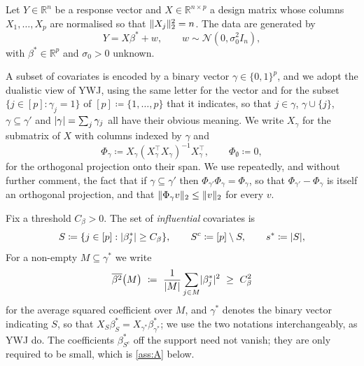 \documentclass[aos]{imsart}
\DeclarePairedDelimiter{\norm}{\lVert}{\rVert}
\DeclarePairedDelimiter{\abs}{\lvert}{\rvert}
\newcommand{\bbR}[0]{\mathbb{R}}
\newcommand{\calN}[0]{\mathcal{N}}
\newcommand{\signal}{X_{\gamma^{\ast}}\beta^{\ast}_{\gamma^{\ast}}}
\newcommand{\betabar}[1]{\overline{\beta^{2}}\bigl(#1\bigr)}
\theoremstyle{plain}
\theoremstyle{definition}
\begin{document}
    Let $Y\in\bbR^{n}$ be a response vector and $X\in\bbR^{n\times p}$ a
    design matrix whose columns $X_1,\dots,X_p$ are normalised so that
    $\norm{X_j}_2^{2}=n$. The data are generated by
    \begin{equation}
        \label{eq:linear}
        Y=X\beta^{\ast}+w,\qquad w\sim\calN(0,\sigma_0^{2}I_n),
    \end{equation}
    with $\beta^\ast\in\bbR^{p}$ and $\sigma_0>0$ unknown.

    A subset of covariates is encoded by a binary vector
    $\gamma\in\{0,1\}^{p}$, and we adopt the dualistic view of YWJ, using the
    same letter for the vector and for the subset $\{j\in[p]:\gamma_j=1\}$ of
    $[p]\coloneq\{1,\dots,p\}$ that it indicates, so that $j\in\gamma$,
    $\gamma\cup\{j\}$, $\gamma\subseteq\gamma'$ and
    $\abs{\gamma}=\sum_j\gamma_j$ all have their obvious meaning. We write
    $X_\gamma$ for the submatrix of $X$ with columns indexed by $\gamma$ and
    \begin{equation}
        \label{eq:proj}
        \Phi_\gamma\coloneq
        X_\gamma(X_\gamma^{\top}X_\gamma)^{-1}X_\gamma^{\top},
        \qquad \Phi_\emptyset\coloneq0,
    \end{equation}
    for the orthogonal projection onto their span. We use repeatedly, and
    without further comment, the fact that if $\gamma\subseteq\gamma'$ then
    $\Phi_{\gamma'}\Phi_\gamma=\Phi_\gamma$, so that
    $\Phi_{\gamma'}-\Phi_\gamma$ is itself an orthogonal projection, and that
    $\norm{\Phi_\gamma v}_2\leq\norm{v}_2$ for every $v$.

    Fix a threshold $C_\beta>0$. The set of \emph{influential} covariates is
    \begin{equation}
        \label{eq:S}
        S\coloneq\{j\in[p]:\abs{\beta^\ast_j}\geq C_\beta\},
        \qquad
        S^{c}\coloneq[p]\setminus S,
        \qquad
        s^{\ast}\coloneq\abs{S},
    \end{equation}
    For a non-empty $M\subseteq\gamma^{\ast}$ we write
    \begin{equation}
        \label{eq:betabar}
        \betabar{M}\ \coloneq\ \frac{1}{\abs{M}}\sum_{j\in M}
        \abs{\beta^{\ast}_j}^{2}\ \geq\ C_\beta^{2}
    \end{equation}
    for the average squared coefficient over $M$, and
    $\gamma^{\ast}$ denotes the binary vector indicating $S$, so that
    $X_S\beta^\ast_S=\signal$; we use the two notations interchangeably, as
    YWJ do. The coefficients $\beta^\ast_{S^{c}}$ off the support need not
    vanish; they are only required to be small, which is \cref{ass:A} below.
\end{document}
